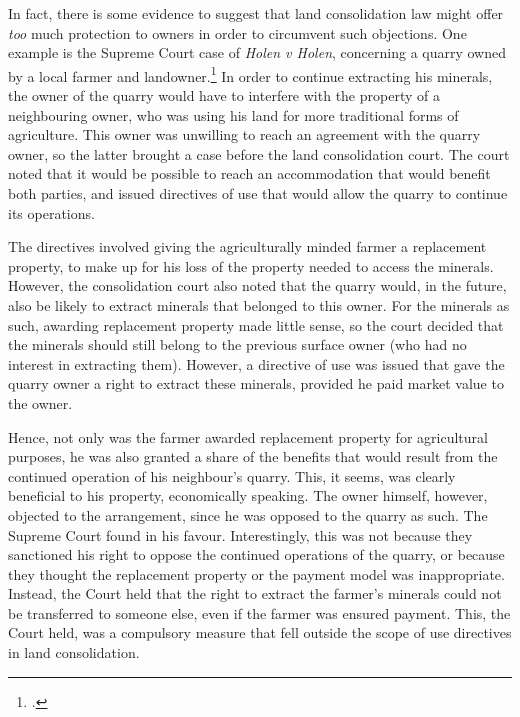 In fact, there is some evidence to suggest that land consolidation law might offer \emph{too} much protection to owners in order to circumvent such objections. One example is the Supreme Court case of 
{\it Holen v Holen}, concerning a quarry owned by a local farmer and landowner.\footcite{holen95} In order to continue extracting his minerals, the owner of the quarry would have to interfere with the property of a neighbouring owner, who was using his land for more traditional forms of agriculture. This owner was unwilling to reach an agreement with the quarry owner, so the latter brought a case before the land consolidation court. The court noted that it would be possible to reach an accommodation that would benefit both parties, and issued directives of use that would allow the quarry to continue its operations.

The directives involved giving the agriculturally minded farmer a replacement property, to make up for his loss of the property needed to access the minerals. However, the consolidation court also noted that the quarry would, in the future, also be likely to extract minerals that belonged to this owner. For the minerals as such, awarding replacement property made little sense, so the court decided that the minerals should still belong to the previous surface owner (who had no interest in extracting them). However, a directive of use was issued that gave the quarry owner a right to extract these minerals, provided he paid market value to the owner. 

Hence, not only was the farmer awarded replacement property for agricultural purposes, he was also granted a share of the benefits that would result from the continued operation of his neighbour's quarry. This, it seems, was clearly beneficial to his property, economically speaking. The owner himself, however, objected to the arrangement, since he was opposed to the quarry as such. The Supreme Court found in his favour. Interestingly, this was not because they sanctioned his right to oppose the continued operations of the quarry, or because they thought the replacement property or the payment model was inappropriate. Instead, the Court held that the right to extract the farmer's minerals could not be transferred to someone else, even if the farmer was ensured payment. This, the Court held, was a compulsory measure that fell outside the scope of use directives in land consolidation.

